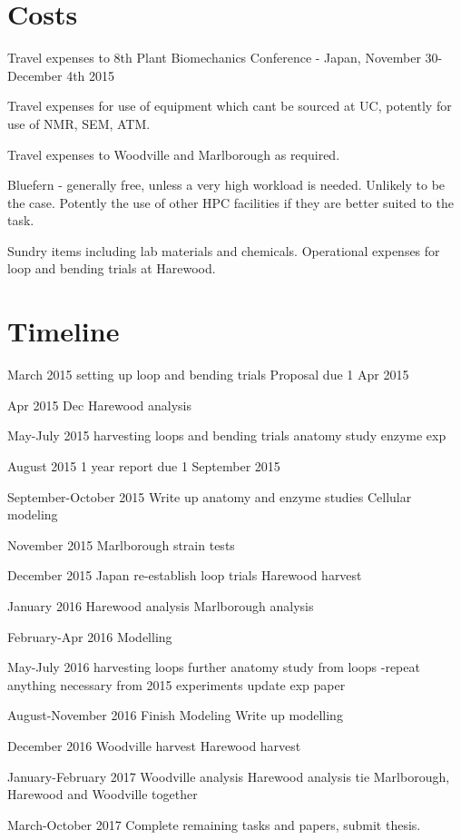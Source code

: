 \documentclass{article}
\begin{document}
\section{Costs}
Travel expenses to 8th Plant Biomechanics Conference - Japan, November
30-December 4th 2015

Travel expenses for use of equipment which cant be sourced at UC,
potently for use of NMR, SEM, ATM.

Travel expenses to Woodville and Marlborough as required.

Bluefern - generally free, unless a very high workload is needed. Unlikely to be
the case. Potently the use of other HPC facilities if they are better suited to
the task.

Sundry items including lab materials and chemicals. Operational
expenses for loop and bending trials at Harewood.

\section{Timeline}

March 2015
setting up loop and bending trials
Proposal due 1 Apr 2015

Apr 2015
Dec Harewood analysis

May-July 2015
harvesting loops and bending trials
anatomy study
enzyme exp

August 2015
1 year report due 1 September 2015

September-October 2015
Write up anatomy and enzyme studies
Cellular modeling

November 2015
Marlborough strain tests

December 2015
Japan
re-establish loop trials
Harewood harvest

January 2016
Harewood analysis
Marlborough analysis

February-Apr 2016
Modelling

May-July 2016
harvesting loops
further anatomy study from loops -repeat anything necessary from 2015
experiments
update exp paper

August-November 2016
Finish Modeling
Write up modelling

December 2016
Woodville harvest
Harewood harvest

January-February 2017
Woodville analysis
Harewood analysis
tie Marlborough, Harewood and Woodville together

March-October 2017
Complete remaining tasks and papers, submit thesis.
\end{document}
